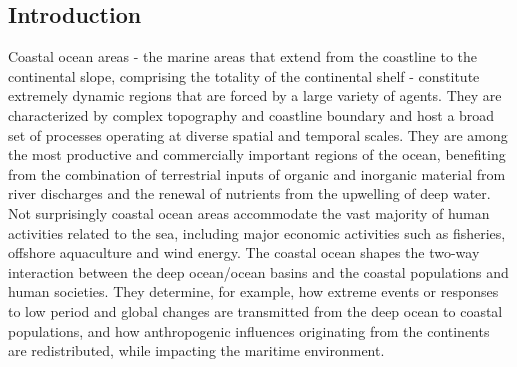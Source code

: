 \subsection{Introduction}

Coastal ocean areas - the marine areas that extend from the coastline to the continental slope, comprising the totality of the continental shelf - constitute extremely dynamic regions that are forced by a large variety of agents. They are characterized by complex topography and coastline boundary and host a broad set of processes operating at
diverse spatial and temporal scales. They are among the most
productive and commercially important regions of the ocean, benefiting from the combination of terrestrial inputs of organic and inorganic material from river discharges and the renewal of nutrients from the upwelling of deep water. Not surprisingly coastal ocean areas accommodate the vast majority of human activities related to the sea, including major economic activities such as fisheries, offshore
aquaculture and wind energy. The coastal ocean shapes the two-way interaction between the deep ocean/ocean basins and the coastal populations and human societies. They determine, for example, how extreme events or responses to low period and global changes are transmitted from the deep ocean to coastal populations, and how anthropogenic influences originating from the continents are
redistributed, while impacting the maritime environment. %
 


